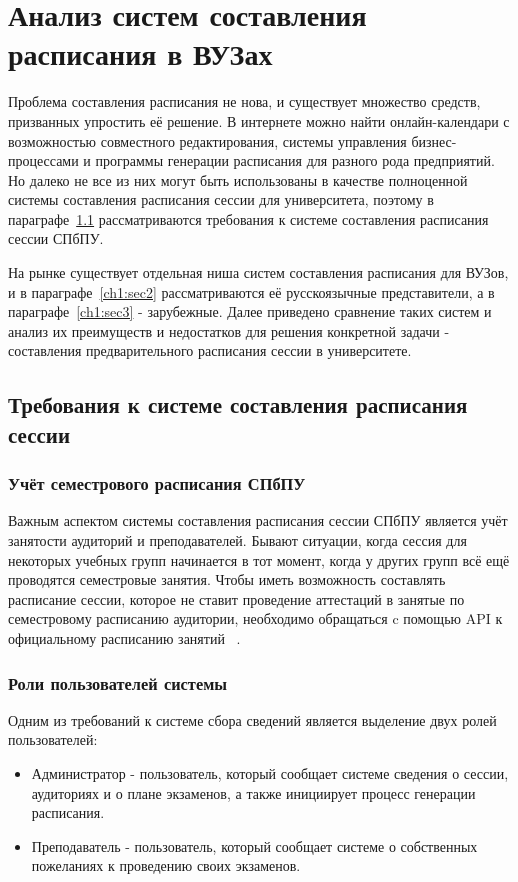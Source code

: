 \chapter{Анализ систем составления расписания в ВУЗах} \label{ch1}

Проблема составления расписания не нова, и существует множество средств, призванных упростить её решение. В интернете можно найти онлайн-календари с возможностью совместного редактирования, системы управления бизнес-процессами и программы генерации расписания для разного рода предприятий. Но далеко не все из них могут быть использованы в качестве полноценной системы составления расписания сессии для университета, поэтому в параграфе~\ref{ch1:sec1} рассматриваются требования к системе составления расписания сессии СПбПУ.

На рынке существует отдельная ниша систем составления расписания для ВУЗов, и в параграфе~\ref{ch1:sec2} рассматриваются её русскоязычные представители, а в параграфе~\ref{ch1:sec3} - зарубежные. Далее приведено сравнение таких систем и анализ их преимуществ и недостатков для решения конкретной задачи - составления предварительного расписания сессии в университете.

\section{Требования к системе составления расписания сессии} \label{ch1:sec1}

\subsection{Учёт семестрового расписания СПбПУ}

Важным аспектом системы составления расписания сессии СПбПУ является учёт занятости аудиторий и преподавателей. Бывают ситуации, когда сессия для некоторых учебных групп начинается в тот момент, когда у других групп всё ещё проводятся семестровые занятия. Чтобы иметь возможность составлять расписание сессии, которое не ставит проведение аттестаций в занятые по семестровому расписанию аудитории, необходимо обращаться c помощью API к официальному расписанию занятий ~\cite{ruz}. 

\subsection{Роли пользователей системы}
Одним из требований к системе сбора сведений является выделение двух ролей пользователей:
\begin{itemize}
	\item Администратор - пользователь, который сообщает системе сведения о сессии, аудиториях и о плане экзаменов, а также инициирует процесс генерации расписания.
	\item Преподаватель - пользователь, который сообщает системе о собственных пожеланиях к проведению своих экзаменов.
\end{itemize}

